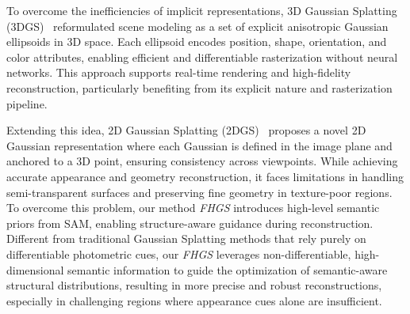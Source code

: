 \documentclass[numbers]{article}
\begin{document}
To overcome the inefficiencies of implicit representations, 3D Gaussian Splatting (3DGS)~\cite{3Dgaussians} reformulated scene modeling as a set of explicit anisotropic Gaussian ellipsoids in 3D space. Each ellipsoid encodes position, shape, orientation, and color attributes, enabling efficient and differentiable rasterization without neural networks. This approach supports real-time rendering and high-fidelity reconstruction, particularly benefiting from its explicit nature and rasterization pipeline.

Extending this idea, 2D Gaussian Splatting (2DGS)~\cite{2dgs} proposes a novel 2D Gaussian representation where each Gaussian is defined in the image plane and anchored to a 3D point, ensuring consistency across viewpoints. While achieving accurate appearance and geometry reconstruction, it faces limitations in handling semi-transparent surfaces and preserving fine geometry in texture-poor regions. To overcome this problem, our method \textit{FHGS} introduces high-level semantic priors from SAM, enabling structure-aware guidance during reconstruction.
Different from traditional Gaussian Splatting methods that rely purely on differentiable photometric cues, our \textit{FHGS} leverages non-differentiable, high-dimensional semantic information to guide the optimization of semantic-aware structural distributions, resulting in more precise and robust reconstructions, especially in challenging regions where appearance cues alone are insufficient.
\end{document}
